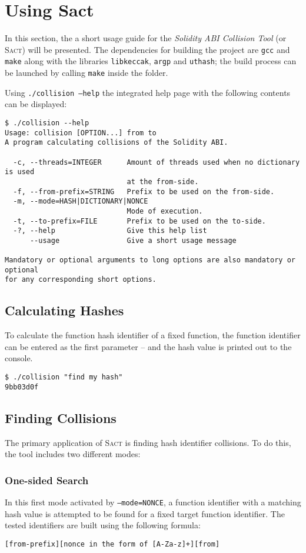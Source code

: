 \section{Using Sact}
\label{appendix:abicollision}
In this section, the a short usage guide for the \textit{Solidity ABI Collision Tool} (or \textsc{Sact}) will be presented. The dependencies for building the project are \texttt{gcc} and \texttt{make} along with the libraries \texttt{libkeccak}, \texttt{argp} and \texttt{uthash}; the build process can be launched by calling \texttt{make} inside the folder.

Using \texttt{./collision --help} the integrated help page with the following contents can be displayed:
\begin{verbatim}
$ ./collision --help
Usage: collision [OPTION...] from to
A program calculating collisions of the Solidity ABI.

  -c, --threads=INTEGER      Amount of threads used when no dictionary is used
                             at the from-side.
  -f, --from-prefix=STRING   Prefix to be used on the from-side.
  -m, --mode=HASH|DICTIONARY|NONCE
                             Mode of execution.
  -t, --to-prefix=FILE       Prefix to be used on the to-side.
  -?, --help                 Give this help list
      --usage                Give a short usage message

Mandatory or optional arguments to long options are also mandatory or optional
for any corresponding short options.
\end{verbatim}

\subsection{Calculating Hashes}
To calculate the function hash identifier of a fixed function, the function identifier can be entered as the first parameter -- and the hash value is printed out to the console.

\begin{verbatim}
$ ./collision "find my hash"
9bb03d0f
\end{verbatim}

\subsection{Finding Collisions}
The primary application of \textsc{Sact} is finding hash identifier collisions. To do this, the tool includes two different modes:

\subsubsection{One-sided Search}
In this first mode activated by \texttt{--mode=NONCE}, a function identifier with a matching hash value is attempted to be found for a fixed target function identifier. The tested identifiers are built using the following formula:
\begin{verbatim}
[from-prefix][nonce in the form of [A-Za-z]+][from]
\end{verbatim}

